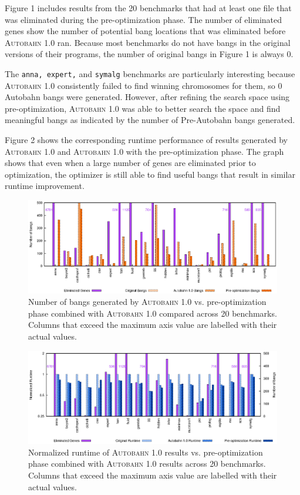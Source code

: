 \documentclass[format=sigplan]{acmart}
\newcommand{\useful}[0]{useful}
\newcommand{\Ao}[0]{\textsc{Autobahn 1.0}}
\newcommand{\preopt}[0]{pre-optimization}
\begin{document}
Figure 1 includes results from the 20 benchmarks that had at least one file that was eliminated during the \preopt{} phase. The number of eliminated genes show the number of potential bang locations that was eliminated before \Ao{} ran. Because most benchmarks do not have bangs in the original versions of their programs, the number of original bangs in Figure 1 is always 0. 

The \texttt{anna, expert,} and \texttt{symalg} benchmarks are particularly interesting because \Ao{} consistently failed to find winning chromosomes for them, so 0 Autobahn bangs were generated. However, after refining the search space using \preopt{}, \Ao{} was able to better search the space and find meaningful bangs as indicated by the number of Pre-Autobahn bangs generated. 

Figure 2 shows the corresponding runtime performance of results generated by \Ao{} and \Ao{} with the \preopt{} phase. The graph shows that even when a large number of genes are eliminated prior to optimization, the optimizer is still able to find \useful{} bangs that result in similar runtime improvement.  

\begin{figure}
\includegraphics[width=\textwidth]{pre-aut-bangs}
\caption{Number of bangs generated by \Ao{} vs. \preopt{} phase combined with \Ao{} compared across 20 benchmarks. Columns that exceed the maximum axis value are labelled with their actual values.}
\end{figure}

\begin{figure}
\includegraphics[width=\textwidth]{pre-aut}
\caption{Normalized runtime of \Ao{} results vs. \preopt{} phase combined with \Ao{} results across 20 benchmarks. Columns that exceed the maximum axis value are labelled with their actual values.}
\end{figure}
\end{document}
